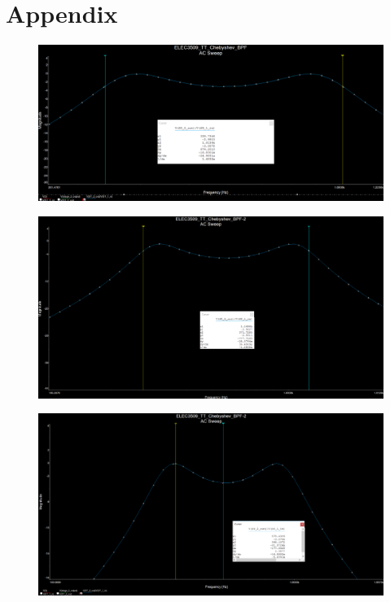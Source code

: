 \documentclass[hidelinks]{article}
\begin{document}
	\section{Appendix}
		\begin{figure}[htbp]
		\centering
		\includegraphics[width=0.6\textheight]{measured_simulated.png}
		\label{f:measured_simulated}
	\end{figure}
	
	\begin{figure}[htbp]
		\centering
		\includegraphics[width=0.6\textheight]{measured_standSimulated.png}
		\label{f:measured_standSimulated}
	\end{figure}

	\pagebreak
	
	\begin{figure}[htbp]
		\centering
		\includegraphics[width=0.6\textheight]{simulated_ripple.png}
		\label{f:simulated_ripple}
	\end{figure}
\end{document}
